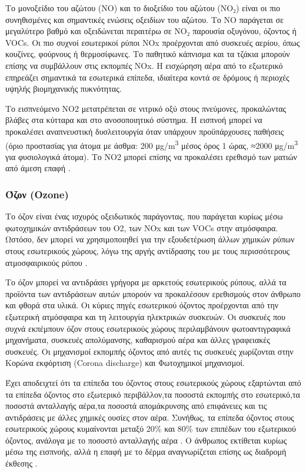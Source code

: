 
Το μονοξείδιο του αζώτου (NO) και το διοξείδιο του αζώτου (NO₂) είναι οι πιο συνηθισμένες και σημαντικές ενώσεις οξειδίων του αζώτου. Το NO παράγεται σε μεγαλύτερο βαθμό και οξειδώνεται περαιτέρω σε NO₂ παρουσία οξυγόνου, όζοντος ή VOCs.
Οι πιο συχνοί εσωτερικοί  ρύποι NOx προέρχονται από συσκευές αερίου, όπως κουζίνες, φούρνους ή θερμοσίφωνες. Το παθητικό κάπνισμα και τα τζάκια μπορούν επίσης να συμβάλλουν στις εκπομπές NOx. Η εισχώρηση αέρα από το εξωτερικό επηρεάζει σημαντικά τα εσωτερικά επίπεδα, ιδιαίτερα κοντά σε δρόμους ή περιοχές υψηλής βιομηχανικής πυκνότητας.

Το εισπνεόμενο NO2 μετατρέπεται σε νιτρικό οξύ στους πνεύμονες, προκαλώντας βλάβες στα κύτταρα και στο ανοσοποιητικό σύστημα. Η εισπνοή μπορεί να προκαλέσει αναπνευστική δυσλειτουργία όταν υπάρχουν προϋπάρχουσες παθήσεις (όριο προστασίας για άτομα με άσθμα: 200 μg/m\textsuperscript{3} μέσος όρος 1 ώρας, ≈2000 μg/m\textsuperscript{3} για φυσιολογικά άτομα). Το NO2 μπορεί επίσης να προκαλέσει ερεθισμό των ματιών από άμεση επαφή \cite{GONZALEZMARTIN2021128376}.


\subsubsection{Όζον (Ozone)}

Το όζον είναι ένας ισχυρός οξειδωτικός παράγοντας, που παράγεται κυρίως μέσω φωτοχημικών αντιδράσεων του O2, των NOx και των VOCs στην ατμόσφαιρα. Ωστόσο, δεν μπορεί να χρησιμοποιηθεί για την εξουδετέρωση άλλων χημικών ρύπων στους εσωτερικούς χώρους, λόγω της αργής αντίδρασης του με τους περισσότερους ατμοσφαιρικούς ρύπου \cite{https://doi.org/10.1034/j.1600-0668.2000.010004269.x}.

Το όζον μπορεί να αντιδράσει γρήγορα με αρκετούς εσωτερικούς ρύπους, αλλά τα προϊόντα των αντιδράσεων αυτών μπορούν να προκαλέσουν ερεθισμούς στον άνθρωπο και φθορά στα υλικά. Οι κύριες πηγές εσωτερικού όζοντος προέρχονται από την εξωτερική ατμόσφαιρα και τη λειτουργία ηλεκτρικών συσκευών. Οι συσκευές που συχνά εκπέμπουν όζον στους εσωτερικούς χώρους περιλαμβάνουν φωτοαντιγραφικά μηχανήματα, συσκευές απολύμανσης, καθαρισμού αέρα και άλλες γραφειακές συσκευές. Οι μηχανισμοί εκπομπής όζοντος από αυτές τις συσκευές χωρίζονται στην Κορώνα εκφόρτιση (Corona discharge) και  Φωτοχημικοί μηχανισμοί.

Έχει αποδειχτεί ότι τα επίπεδα του όζοντος στους εσωτερικούς χώρους εξαρτώνται από τα επίπεδα όζοντος στο εξωτερικό περιβάλλον,τα ποσοστά εκπομπής στο εσωτερικό,τα ποσοστά ανταλλαγής αέρα,τα ποσοστά απομάκρυνσης από επιφάνειες και τις αντιδράσεις με άλλες χημικές ουσίες στον αέρα. Συνήθως, τα επίπεδα όζοντος στους εσωτερικούς χώρους κυμαίνονται μεταξύ 20\% και 80\% των επιπέδων του εξωτερικού όζοντος, ανάλογα με το ποσοστό ανταλλαγής αέρα . Ο άνθρωπος εκτίθεται κυρίως μέσω της εισπνοής, αλλά η επαφή με το δέρμα αναγνωρίζεται επίσης ως διαδρομή έκθεσης 
\cite{ijerph17082927}.

